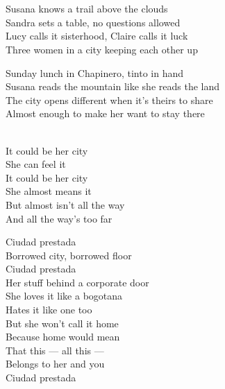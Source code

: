 \begin{lyrics}
\\
\\
Susana knows a trail above the clouds\\
Sandra sets a table, no questions allowed\\
Lucy calls it sisterhood, Claire calls it luck\\
Three women in a city keeping each other up

Sunday lunch in Chapinero, tinto in hand\\
Susana reads the mountain like she reads the land\\
The city opens different when it's theirs to share\\
Almost enough to make her want to stay there

\\
It could be her city\\
She can feel it\\
It could be her city\\
She almost means it\\
But almost isn't all the way\\
And all the way's too far

Ciudad prestada\\
Borrowed city, borrowed floor\\
Ciudad prestada\\
Her stuff behind a corporate door\\
She loves it like a bogotana\\
Hates it like one too\\
But she won't call it home\\
Because home would mean\\
That this — all this —\\
Belongs to her and you\\
Ciudad prestada


\end{lyrics}
